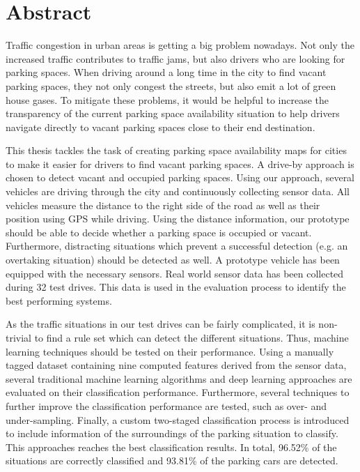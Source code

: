 

\chapter*{Abstract}

Traffic congestion in urban areas is getting a big problem nowadays. Not only the increased traffic contributes to traffic jams, but also drivers who are looking for parking spaces. When driving around a long time in the city to find vacant parking spaces, they not only congest the streets, but also emit a lot of green house gases.
To mitigate these problems, it would be helpful to increase the transparency of the current parking space availability situation to help drivers navigate directly to vacant parking spaces close to their end destination. 

This thesis tackles the task of creating parking space availability maps for cities to make it easier for drivers to find vacant parking spaces. A drive-by approach is chosen to detect vacant and occupied parking spaces. 
Using our approach, several vehicles are driving through the city and continuously collecting sensor data. All vehicles measure the distance to the right side of the road as well as their position using GPS while driving. Using the distance information, our prototype should be able to decide whether a parking space is occupied or vacant. Furthermore, distracting situations which prevent a successful detection (e.g. an overtaking situation) should be detected as well. A prototype vehicle has been equipped with the necessary sensors. Real world sensor data has been collected during 32 test drives. This data is used in the evaluation process to identify the best performing systems.

As the traffic situations in our test drives can be fairly complicated, it is non-trivial to find a rule set which can detect the different situations. Thus, machine learning techniques should be tested on their performance. Using a manually tagged dataset containing nine computed features derived from the sensor data, several traditional machine learning algorithms and deep learning approaches are evaluated on their classification performance. Furthermore, several techniques to further improve the classification performance are tested, such as over- and under-sampling. 
Finally, a custom two-staged classification process is introduced to include information of the surroundings of the parking situation to classify. This approaches reaches the best classification results. In total, 96.52\% of the situations are correctly classified and 93.81\% of the parking cars are detected.


